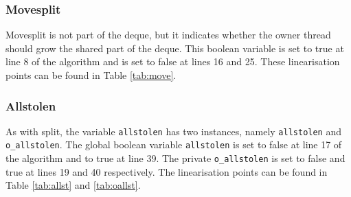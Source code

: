 \documentclass{sig-alternate-br}
\begin{document}
\subsubsection{Movesplit}
Movesplit is not part of the deque, but it indicates whether the owner thread should grow the shared part of the deque.
This boolean variable is set to true at line 8 of the algorithm and is set to false at lines 16 and 25.
These linearisation points can be found in Table \ref{tab:move}.

\subsubsection{Allstolen}
As with split, the variable \texttt{allstolen} has two instances, namely \texttt{allstolen} and \texttt{o\_allstolen}.
The global boolean variable \texttt{allstolen} is set to false at line 17 of the algorithm and to true at line 39.
The private \texttt{o\_allstolen} is set to false and true at lines 19 and 40 respectively.
The linearisation points can be found in Table \ref{tab:allst} and \ref{tab:oallst}.
\end{document}
